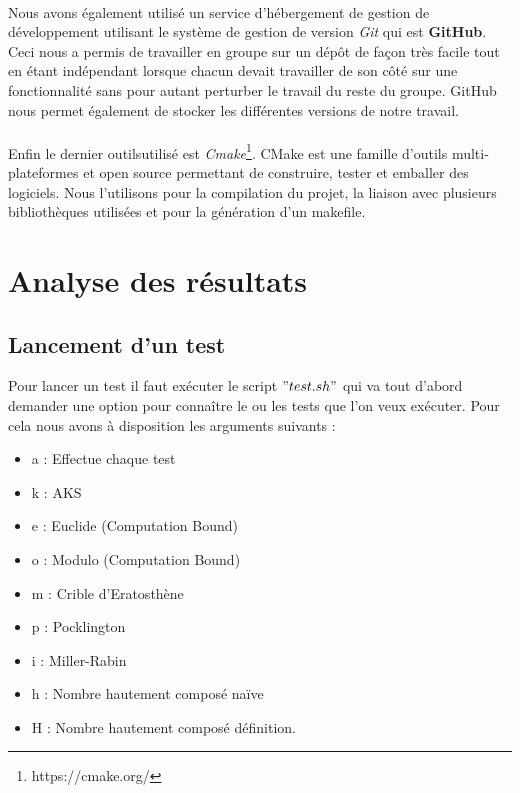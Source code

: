		\paragraph{}Nous avons également utilisé un service d’hébergement de gestion de développement utilisant le système de gestion de version \textit{Git} qui est \textbf{GitHub}. Ceci nous a permis de travailler en groupe sur un dépôt de façon très facile tout en étant indépendant lorsque chacun devait travailler de son côté sur une fonctionnalité sans pour autant perturber le travail du reste du groupe. GitHub nous permet également de stocker les différentes versions de notre travail.   
		\paragraph{}Enfin le dernier outilsutilisé est \textit{Cmake}\footnote{https://cmake.org/}. CMake est une famille d'outils multi-plateformes et open source permettant de construire, tester et emballer des logiciels. Nous l'utilisons pour la compilation du projet, la liaison avec plusieurs bibliothèques utilisées et pour la génération d'un makefile. 
			
	\section{Analyse des résultats}
		\subsection{Lancement d'un test}
	Pour lancer un test il faut exécuter le script $"test.sh"$ qui va tout d'abord demander une option pour connaître le ou les tests que l'on veux exécuter. Pour cela nous avons à disposition les arguments suivants : 
	\begin{itemize}
		\item a : Effectue chaque test
		\item k : AKS
		\item e : Euclide (Computation Bound)
		\item o : Modulo (Computation Bound)
		\item m : Crible d'Eratosthène
		\item p : Pocklington
		\item i : Miller-Rabin
		\item h : Nombre hautement composé naïve
		\item H : Nombre hautement composé définition.
	\end{itemize}
	
